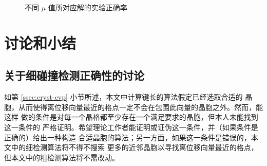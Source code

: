 \begin{figure}[htbp!]\bfcmd
\vspace{\slop{0.3em}}
\setlength{\columnsep}{3em}
\begin{floatrow}
		{\caption{不同 $\mu$ 值所对应解的实验正确率}\label{fig:db-distrib-2}}
\end{floatrow}
\vspace{\slop{-0.3em}}
\end{figure}

\section{讨论和小结}
\subsection{关于细碰撞检测正确性的讨论}\label{ssec:narrow-discus}

如第 \ref{ssec:cryst-cvp} 小节所述，本文中计算键长的算法假定已经选取合适的
晶胞，从而使得离位移向量最近的格点一定不会在包围此向量的晶胞之外。然而，能这样
做的条件是对每一个晶格都至少存在一个满足要求的晶胞，但本人未能找到这一条件的
严格证明。希望理论工作者能证明或证伪这一条件，并（如果条件是正确的）给出一种构造
合适晶胞的算法；另一方面，如果这一条件是错误的，本文中的细检测算法将不得不搜索
更多的近邻晶胞以寻找离位移向量最近的格点，但本文中的粗检测算法将不需改动。


